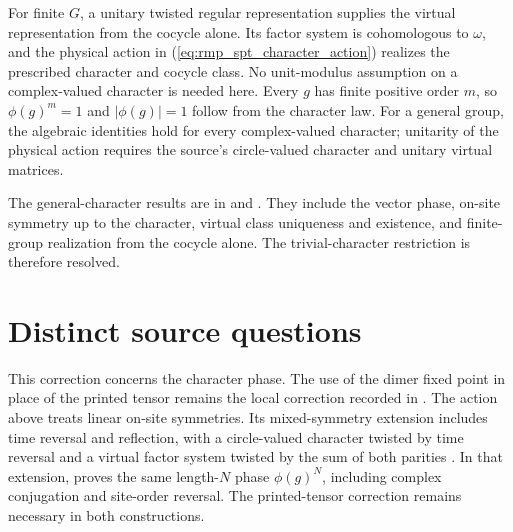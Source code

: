 \documentclass{article}
\begin{document}
For finite $G$, a unitary twisted regular representation supplies the
virtual representation from the cocycle alone. Its factor system is
cohomologous to $\omega$, and the physical action in
(\ref{eq:rmp_spt_character_action}) realizes the prescribed character and
cocycle class. No unit-modulus assumption on a complex-valued character
is needed here. Every $g$ has finite positive order $m$, so
$\phi(g)^m=1$ and $|\phi(g)|=1$ follow from the character law. For a general
group, the algebraic identities hold for every complex-valued character;
unitarity of the physical action requires the source's circle-valued
character and unitary virtual matrices.

The general-character results are in
 and
. They include the vector phase,
on-site symmetry up to the character, virtual class uniqueness and
existence, and finite-group realization from the cocycle alone. The
trivial-character restriction is therefore resolved.

\section{Distinct source questions}
This correction concerns the character phase. The use of the dimer fixed
point in place of the printed tensor remains the local correction recorded
in \cite{gap:rmp_spt_fixed_point_tensor}. The action above treats linear
on-site symmetries. Its mixed-symmetry extension includes time reversal
and reflection, with a circle-valued character twisted by time reversal
and a virtual factor system twisted by the sum of both parities
\cite{gap:rmp_spt_fixed_point_onsite_scope}. In that extension,
 proves the same length-$N$ phase
$\phi(g)^N$, including complex conjugation and site-order reversal. The
printed-tensor correction remains necessary in both constructions.



\end{document}
